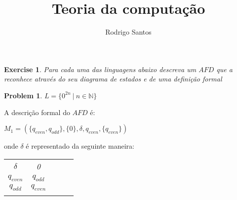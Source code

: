 \documentclass{article}
\title{Teoria da computação}
\author{Rodrigo Santos}
\begin{document}
\maketitle


\theoremstyle{plain}
\newtheorem{xca}{Exercise}
\theoremstyle{definition}
\newtheorem{prob}{Problem}

\begin{xca}
  Para cada uma das linguagens abaixo descreva um $AFD$ que a reconhece através do seu diagrama de estados e de uma definição formal
\end{xca}

\begin{prob}
  $L = \{0^{2n} \ | \ n \in \mathbb{N}\}$

  \begin{center}
  \end{center}

  A descrição formal do $AFD$ é:
  \begin{center}
    $M_1 = (\{q_{even},q_{odd}\}, \{0\},\delta,q_{even}, \{q_{even}\})$
  \end{center}
  onde $\delta$ é representado da seguinte maneira:
  \begin{table}[htbp]
    \centering
    \begin{tabular}{cclll}
      \multicolumn{1}{c|}{\textit{$\delta$}}   & \textit{0}                    & \textit{} & \textit{} & \textit{} \\ \cline{1-2}
      \multicolumn{1}{c|}{\textit{$q_{even}$}} & \textit{$q_{odd}$}            & \textit{} & \textit{} & \textit{} \\
      \multicolumn{1}{c|}{\textit{$q_{odd}$}}  & \textit{$q_{even}$}           & \textit{} & \textit{} & \textit{} \\
      \multicolumn{1}{l}{\textit{}}            & \multicolumn{1}{l}{\textit{}} & \textit{} & \textit{} & \textit{}
    \end{tabular}
  \end{table}
\end{prob}
\end{document}
